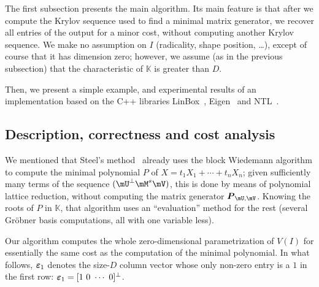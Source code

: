 \documentclass[12pt]{article}
\newcommand{\mat}[1]{\bm{\MakeUppercase{#1}}} %
\newcommand{\col}[1]{\bm{\MakeLowercase{#1}}} %
\newcommand{\minpoly}{P}
\newcommand{\lf}{X}
\def\K{\mathbb{K}}
\def\K {\ensuremath{\mathbb{K}}}
\begin{document}
The first subsection presents the main algorithm. Its main feature is
that after we compute the Krylov sequence used to find a minimal
matrix generator, we recover all entries of the output for a minor
cost, without computing another Krylov sequence. We make no assumption
on $I$ (radicality, shape position, \dots), except of course that it
has dimension zero; however, we assume (as in the previous subsection)
that the characteristic of $\K$ is greater than $D$. 

Then, we present a simple example, and experimental results of an
implementation based on the C++ libraries LinBox~\cite{LinBox},
Eigen~\cite{Eigen} and NTL~\cite{NTL}.


\subsection{Description, correctness and cost analysis}\label{ssec:mainalgo}

We mentioned that Steel's method~\cite{Steel15} already uses the block
Wiedemann algorithm to compute the minimal polynomial $\minpoly$ of
$\lf=t_1 X_1 + \cdots + t_n X_n$; given sufficiently many terms of the
sequence $(\mU^\perp \mM^s \mV)$, this is done by means of polynomial
lattice reduction, without computing the matrix generator
$\mat{P}_{\mU,\mV}$. Knowing the roots of $\minpoly$ in $\K$, that
algorithm uses an ``evaluation'' method for the rest (several
Gr\"obner basis computations, all with one variable less).

Our algorithm computes the whole zero-dimensional parametrization of
$V(I)$ for essentially the same cost as the computation of the minimal
polynomial. In what follows, $\col{\varepsilon}_1$ denotes the
size-$D$ column vector whose only non-zero entry is a $1$ in the first
row: $\col{\varepsilon}_1 =[1~0~\cdots~0]^\perp$.
\end{document}
